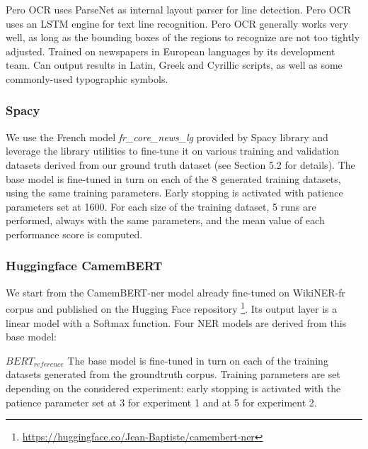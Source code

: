 Pero OCR uses ParseNet  as internal layout parser for line detection.
Pero OCR uses an LSTM engine  for text line recognition.
Pero OCR generally works very well, as long as the bounding boxes of the regions to recognize are not too tightly adjusted.
Trained on newspapers in European languages by its development team.
Can output results in Latin, Greek and Cyrillic scripts, as well as some commonly-used typographic symbols.



\subsubsection{Spacy}
We use the French model \textit{fr\_core\_news\_lg} provided by Spacy library and leverage the library utilities to fine-tune it on various training and validation datasets derived from our ground truth dataset (see Section 5.2 for details). The base model is fine-tuned in turn on each of the 8 generated training datasets, using the same training parameters. Early stopping is activated with patience parameters set at 1600. For each size of the training dataset, 5 runs are performed, always with the same parameters, and the mean value of each performance score is computed.


\subsubsection{Huggingface CamemBERT}
We start from the CamemBERT-ner model already fine-tuned on WikiNER-fr corpus and published on the Hugging Face repository \footnote{\url{https://huggingface.co/Jean-Baptiste/camembert-ner}}. Its output layer is a linear model with a Softmax function. Four NER models are derived from this base model: 

$BERT_{reference}$ The base model is fine-tuned in turn on each of the training datasets generated from the groundtruth corpus. Training parameters are set depending on the considered experiment: early stopping is activated with the patience parameter set at 3 for experiment 1 and at 5 for experiment 2.

